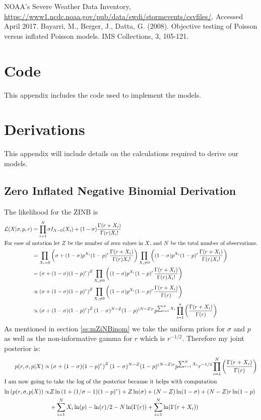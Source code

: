 \documentclass{article}\usepackage[]{graphicx}\usepackage[]{color}
\begin{document}
\begin{thebibliography}{2}
   NOAA's Severe Weather Data Inventory, 
    \url{https://www1.ncdc.noaa.gov/pub/data/swdi/stormevents/csvfiles/}. 
    Accessed April 2017.
   Bayarri, M., Berger, J., Datta, G. (2008). Objective testing of Poisson versus inflated Poisson models. IMS 	Collections, 3, 105-121. 
\end{thebibliography}
\clearpage
\appendix
\section{Code}
\label{a:code}
This appendix includes the code used to implement the models.

\section{Derivations}
\label{a:derivation}
This appendix will include details on the calculations required to derive our models.
\subsection{Zero Inflated Negative Binomial Derivation}
\label{a:dZINB}
The likelihood for the ZINB is 
\begin{align*}
\mathcal{L}(X|\sigma, p, r) &= \prod_{i=1}^N \sigma I_{X=0}(X_i) + (1-\sigma)\frac{\Gamma(r+X_i)}{\Gamma(r)X_i!}\\
\intertext{For ease of notation let $Z$ be the number of zero values in $X$, and $N$ be the total number of observations.}
&=\prod_{X_i=0}\left(\sigma + (1-\sigma)p^{X_i}(1-p)^r\frac{\Gamma(r+X_i)}{\Gamma(r)X_i!}\right)\prod_{X_i\ne 0}\left((1-\sigma)p^{X_i}(1-p)^r\frac{\Gamma(r+X_i)}{\Gamma(r)X_i!}\right)\\
&=\left(\sigma + (1-\sigma)(1-p)^r\right)^Z\prod_{X_i\ne 0}\left((1-\sigma)p^{X_i}(1-p)^r\frac{\Gamma(r+X_i)}{\Gamma(r)X_i!}\right)\\
&\propto\left(\sigma + (1-\sigma)(1-p)^r\right)^Z\prod_{X_i\ne 0}\left((1-\sigma)p^{X_i}(1-p)^r\frac{\Gamma(r+X_i)}{\Gamma(r)}\right)\\
&\propto\left(\sigma + (1-\sigma)(1-p)^r\right)^Z(1-\sigma)^{N-Z}(1-p)^{(N-Z)r}p^{\sum_{i=1}^NX_i}\prod_{i=1}^n\left(\frac{\Gamma(r+X_i)}{\Gamma(r)}\right)
\end{align*}
As mentioned in section \ref{ss:mZiNBinom} we take the uniform priors for $\sigma$ and $p$ as well as the non-informative gamma for $r$ which is $r^{-1/2}$. Therefore my joint posterior is:
\begin{align*}
p(r,\sigma, p|X)\propto&\left(\sigma + (1-\sigma)(1-p)^r\right)^Z(1-\sigma)^{N-Z}(1-p)^{(N-Z)r}p^{\sum_{i=1}^NX_i}r^{-1/2}\prod_{i=1}^N\left(\frac{\Gamma(r+X_i)}{\Gamma(r)}\right)\\
\intertext{I am now going to take the log of the posterior because it helps with computation}
\ln\left(p(r,\sigma, p|X)\right)\propto&Z\ln\left(1 + (1/\sigma-1)(1-p)^r\right) + Z\ln(\sigma) + (N-Z)\ln(1-\sigma)+(N-Z)r\ln(1-p)\\
&+\sum_{i=1}^NX_i\ln(p)-\ln(r)/2-N\ln(\Gamma(r))+\sum_{i=1}^N\ln(\Gamma(r+X_i))
\end{align*}
\end{document}
